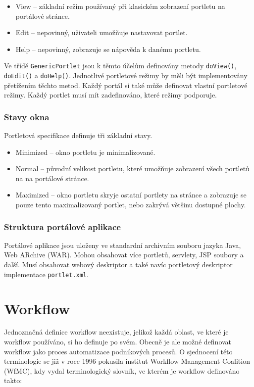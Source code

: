 \documentclass{fithesis}
\begin{document}
\begin{itemize}
\item View -- základní režim používaný při klasickém zobrazení portletu na portálové stránce.
\item Edit -- nepovinný, uživateli umožňuje nastavovat portlet.
\item Help -- nepovinný, zobrazuje se nápověda k danému portletu.
\end{itemize}

Ve třídě \verb|GenericPortlet| jsou k těmto účelům definovány metody \verb|doView()|, \verb|doEdit()| a \verb|doHelp()|. Jednotlivé portletové režimy by měli být implementovány přetížením těchto metod. Každý portál si také může definovat vlastní portletové režimy. Každý portlet musí mít zadefinováno, které režimy podporuje.

\subsection{Stavy okna}
Portletová specifikace definuje tři základní stavy.

\begin{itemize}
\item Minimized -- okno portletu je minimalizované.
\item Normal -- původní velikost portletu, které umožňuje zobrazení všech portletů na na portálové stránce.
\item Maximized -- okno portletu skryje ostatní portlety na stránce a zobrazuje se pouze tento maximalizovaný portlet, nebo zakrývá většinu dostupné plochy.
\end{itemize}

\subsection{Struktura portálové aplikace}
Portálové aplikace jsou uloženy ve standardní archivním souboru jazyka Java, Web ARchive (WAR). Mohou obsahovat více portletů, servlety, JSP soubory a další. Musí obsahovat webový deskriptor a také navíc portletový deskriptor implementace \verb|portlet.xml|.


















\chapter{Workflow}
Jednoznačná definice workflow neexistuje, jelikož každá oblast, ve které je workflow používáno, si ho definuje po svém. Obecně je ale možné definovat workflow jako proces automatizace podnikových procesů. O sjednocení této terminologie se již v roce 1996 pokusila institut Workflow Management Coalition (WfMC), kdy vydal terminologický slovník, ve kterém je workflow definováno takto: 
\end{document}
